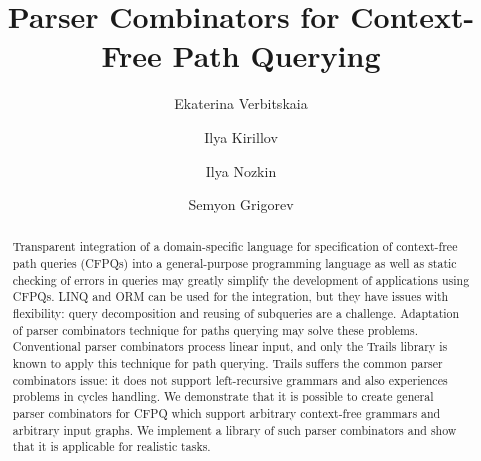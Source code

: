 \documentclass[sigplan,screen]{acmart}
\begin{document}
\title{Parser Combinators for Context-Free Path Querying}


\author{Ekaterina Verbitskaia}

\author{Ilya Kirillov}

\author{Ilya Nozkin}


\author{Semyon Grigorev}

\renewcommand{\shortauthors}{Verbitskaia et al.}

\begin{abstract}
Transparent integration of a domain-specific language for specification of context-free path queries (CFPQs) into a general-purpose programming language as well as static checking of errors in queries may greatly simplify the development of applications using CFPQs.
LINQ and ORM can be used for the integration, but they have issues with flexibility: query decomposition and reusing of subqueries are a challenge.
Adaptation of parser combinators technique for paths querying may solve these problems.
Conventional parser combinators process linear input, and only the Trails library is known to apply this technique for path querying.
Trails suffers the common parser combinators issue: it does not support left-recursive grammars and also experiences problems in cycles handling.
We demonstrate that it is possible to create general parser combinators for CFPQ which support arbitrary context-free grammars and arbitrary input graphs.
We implement a library of such parser combinators and show that it is applicable for realistic tasks.
\end{abstract}
\end{document}
